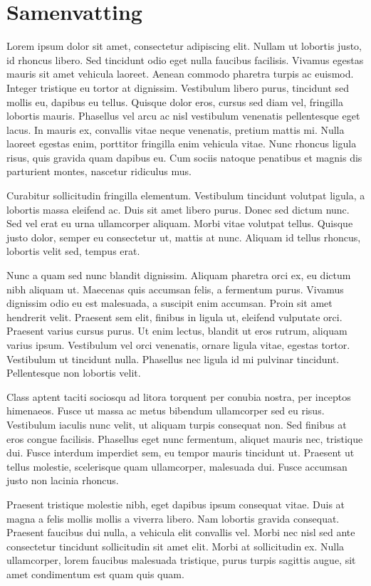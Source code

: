 \documentclass[a4paper,10pt,titlepage]{article}
\def\s{\section}                              %
\begin{document}
\s*{\hfill Samenvatting \hfill}
\begin{center}
Lorem ipsum dolor sit amet, consectetur adipiscing elit. Nullam ut lobortis justo, id rhoncus libero. Sed tincidunt odio eget nulla faucibus facilisis. Vivamus egestas mauris sit amet vehicula laoreet. Aenean commodo pharetra turpis ac euismod. Integer tristique eu tortor at dignissim. Vestibulum libero purus, tincidunt sed mollis eu, dapibus eu tellus. Quisque dolor eros, cursus sed diam vel, fringilla lobortis mauris. Phasellus vel arcu ac nisl vestibulum venenatis pellentesque eget lacus. In mauris ex, convallis vitae neque venenatis, pretium mattis mi. Nulla laoreet egestas enim, porttitor fringilla enim vehicula vitae. Nunc rhoncus ligula risus, quis gravida quam dapibus eu. Cum sociis natoque penatibus et magnis dis parturient montes, nascetur ridiculus mus.
\null

\null

Curabitur sollicitudin fringilla elementum. Vestibulum tincidunt volutpat ligula, a lobortis massa eleifend ac. Duis sit amet libero purus. Donec sed dictum nunc. Sed vel erat eu urna ullamcorper aliquam. Morbi vitae volutpat tellus. Quisque justo dolor, semper eu consectetur ut, mattis at nunc. Aliquam id tellus rhoncus, lobortis velit sed, tempus erat.
\null

\null

Nunc a quam sed nunc blandit dignissim. Aliquam pharetra orci ex, eu dictum nibh aliquam ut. Maecenas quis accumsan felis, a fermentum purus. Vivamus dignissim odio eu est malesuada, a suscipit enim accumsan. Proin sit amet hendrerit velit. Praesent sem elit, finibus in ligula ut, eleifend vulputate orci. Praesent varius cursus purus. Ut enim lectus, blandit ut eros rutrum, aliquam varius ipsum. Vestibulum vel orci venenatis, ornare ligula vitae, egestas tortor. Vestibulum ut tincidunt nulla. Phasellus nec ligula id mi pulvinar tincidunt. Pellentesque non lobortis velit.
\null

\null

Class aptent taciti sociosqu ad litora torquent per conubia nostra, per inceptos himenaeos. Fusce ut massa ac metus bibendum ullamcorper sed eu risus. Vestibulum iaculis nunc velit, ut aliquam turpis consequat non. Sed finibus at eros congue facilisis. Phasellus eget nunc fermentum, aliquet mauris nec, tristique dui. Fusce interdum imperdiet sem, eu tempor mauris tincidunt ut. Praesent ut tellus molestie, scelerisque quam ullamcorper, malesuada dui. Fusce accumsan justo non lacinia rhoncus.
\null

\null

Praesent tristique molestie nibh, eget dapibus ipsum consequat vitae. Duis at magna a felis mollis mollis a viverra libero. Nam lobortis gravida consequat. Praesent faucibus dui nulla, a vehicula elit convallis vel. Morbi nec nisl sed ante consectetur tincidunt sollicitudin sit amet elit. Morbi at sollicitudin ex. Nulla ullamcorper, lorem faucibus malesuada tristique, purus turpis sagittis augue, sit amet condimentum est quam quis quam. 
\end{center}
\vspace{\fill}
\newpage
\end{document}
